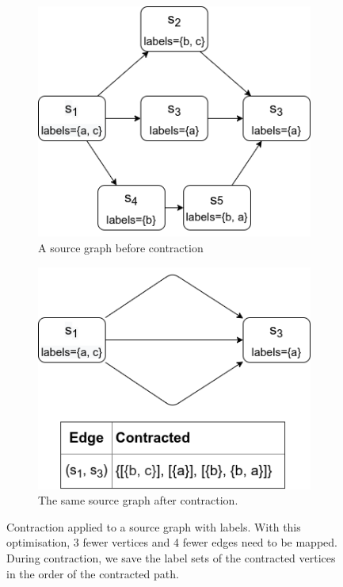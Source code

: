 \begin{figure}
\begin{subfigure}{.5\textwidth}
  \centering
\includegraphics[scale=0.6]{images/contraction/after.png}
  \caption{A source graph before contraction}
\end{subfigure}
\begin{subfigure}{.5\textwidth}
  \centering
\includegraphics[scale=0.6]{images/contraction/before.png}
  \caption{The same source graph after contraction.}
\end{subfigure}
\caption{Contraction applied to a source graph with labels. With this optimisation, 3 fewer vertices and 4 fewer edges need to be mapped. During contraction, we save the label sets of the contracted vertices in the order of the contracted path.}
\label{fig:contraction}
\end{figure}



